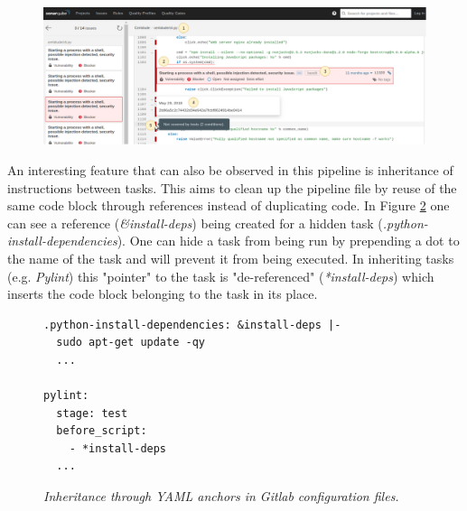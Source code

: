 \begin{figure}[!htb]
    \centering
    \begin{minipage}{\textwidth}
    \includegraphics[width=1\linewidth]{figures/screenshots/sonarqube-analysis3.png}
    \end{minipage}
    \label{fig:sonarqube-result}
\end{figure}

An interesting feature that can also be observed in this pipeline is inheritance of instructions between tasks. This aims to clean up the pipeline file by reuse of the same code block through references instead of duplicating code. In Figure \ref{fig:yaml-anchor} one can see a reference (\textit{\&install-deps}) being created for a hidden task (\textit{.python-install-dependencies}). One can hide a task from being run by prepending a dot to the name of the task and will prevent it from being executed. In inheriting tasks (e.g. \textit{Pylint}) this "pointer" to the task is "de-referenced" (\textit{*install-deps}) which inserts the code block belonging to the task in its place.

\begin{figure}[H]
\centering
\begin{lstlisting}[frame=single, basicstyle=\small, linewidth=\textwidth]
.python-install-dependencies: &install-deps |-
  sudo apt-get update -qy
  ...
  
pylint:
  stage: test
  before_script:
    - *install-deps
  ...
\end{lstlisting}
\caption{\textit{Inheritance through YAML anchors in Gitlab configuration files.}}
\label{fig:yaml-anchor}
\end{figure}

